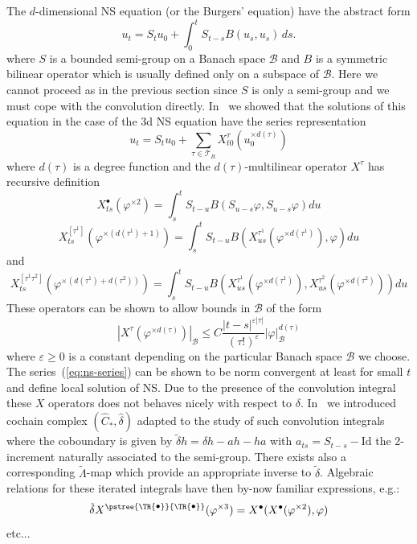 \documentclass[a4paper,11pt,reqno]{article}
\newcommand{\1}{{\bf 1}}
\newcommand{\eps}{\varepsilon}
\newcommand{\der}{\delta}
\newcommand{\TT}{\mathcal{T}}
\newcommand{\tsnode}{\TR{\raisebox{0.5pt}{\ensuremath{\scriptstyle\bullet}}}}
\newcommand{\tsroot}{\ensuremath{\scriptstyle\bullet}}
\newcommand{\aabb}{\pstree{\tsnode}{\tsnode}}
\begin{document}
The $d$-dimensional NS equation (or the Burgers' equation) have the abstract form
\begin{equation}
  \label{eq:NS-c-abstract}
u_t = S_t u_0 +  \int_0^t S_{t-s}  B(u_s,u_s)\,ds.
\end{equation}
where $S$ is a bounded semi-group on a Banach space $\mathcal{B}$ and $B$ is a symmetric bilinear operator which is usually defined only on a subspace of $\mathcal{B}$. 
 Here we cannot proceed as in the
previous section since $S$ is only a semi-group and we must cope with
the convolution directly.
In~\cite{MR2227041} we showed that the solutions of this equation in the case of the 3d NS equation have
the series representation
\begin{equation}
  \label{eq:ns-series}
u_t = S_t u_0 + \sum_{\tau \in \TT_{B}} X^{\tau}_{t0}(u_0^{\times d(\tau)})   
\end{equation}
where $d(\tau)$ is a degree function and the $d(\tau)$-multilinear operator
$X^{\tau}$ has recursive definition
$$
X^{\tsroot}_{ts} (\varphi^{\times 2}) = \int_s^t S_{t-u}
B(S_{u-s}\varphi,S_{u-s}\varphi) du
$$
$$
X^{[\tau^1]}_{ts}(\varphi^{\times (d(\tau^1)+1)}) = \int_s^t
S_{t-u}B(X^{\tau^1}_{us}(\varphi^{\times d(\tau^1)}),\varphi) du
$$
and
$$
X^{[\tau^1 \tau^2]}_{ts}(\varphi^{\times (d(\tau^1)+d(\tau^2))}) = \int_s^t
S_{t-u}B(X^{\tau^1}_{us}(\varphi^{\times d(\tau^1)}),X^{\tau^2}_{us}(\varphi^{\times d(\tau^2)})) du
$$
These operators can be shown to allow bounds in $\mathcal{B}$ of the form
$$
|X^{\tau}(\varphi^{\times d(\tau)})|_{\mathcal{B}} \le C \frac{|t-s|^{\eps |\tau|}}{(\tau!)^{\eps}} |\varphi|_{\mathcal{B}}^{d(\tau)}
$$
where $\eps\ge 0$ is a constant depending on the particular Banach
space $\mathcal{B}$ we choose. The series~(\ref{eq:ns-series}) can be shown to be norm convergent at least for  small $t$ and define local solution of NS.
Due to the presence of the convolution integral these $X$ operators
does not behaves nicely with respect to
$\der$. In~\cite{TindelGubinelli} we introduced cochain complex $(\hat
C_*,\hat \der)$ adapted to the study of such convolution integrals
where the coboundary is given by $\tilde \der h = \der h - ah - ha$ with $a_{ts} =
S_{t-s}-\text{Id}$ the 2-increment naturally associated to the
semi-group. There exists also a corresponding $\tilde \Lambda$-map which
provide an appropriate inverse to $\tilde \der$. Algebraic relations for
these iterated integrals have then  by-now familiar expressions, e.g.:
$$
\tilde \der X^{\aabb}(\varphi^{\times 3}) =
X^{\tsroot}(X^{\tsroot}(\varphi^{\times 2}),\varphi) 
$$
etc...
\end{document}
